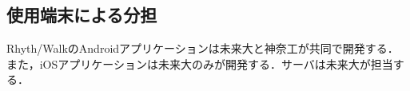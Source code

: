 \subsection{使用端末による分担}
\par
Rhyth/WalkのAndroidアプリケーションは未来大と神奈工が共同で開発する．また，iOSアプリケーションは未来大のみが開発する．サーバは未来大が担当する．
